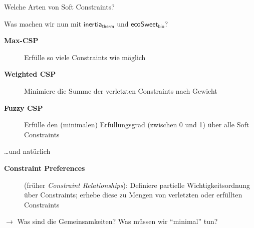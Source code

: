 \begin{frame}{Welche Arten von Soft Constraints?}

Was machen wir nun mit \alert{$\mathsf{inertia}_{\mathsf{therm}}$} und 
\alert{$\mathsf{ecoSweet}_{\mathsf{bio}}$}?
\begin{description}

\item[\textbf{Max-CSP}] Erfülle so viele Constraints wie möglich \hfill {} \pause 
\item[\textbf{Weighted CSP}] Minimiere die Summe der verletzten Constraints nach Gewicht \pause \hfill {}
\item[\textbf{Fuzzy CSP}] Erfülle den (minimalen) Erfüllungsgrad (zwischen 0 und 1) über alle Soft Constraints \hfill {} \pause 
\end{description} \pause 

\vspace*{1ex}

\ldots und natürlich 

\vspace*{1ex}

\begin{description}
\item[\textbf{Constraint Preferences}] (früher \emph{Constraint Relationships}): Definiere partielle Wichtigkeitsordnung über Constraints; erhebe diese zu Mengen von verletzten oder erfüllten Constraints \hfill {}
\end{description}

\vspace*{1ex}
\begin{parchment}
$\rightarrow$ Was sind die Gemeinsamkeiten? Was müssen wir ``minimal'' tun?
\end{parchment}
\end{frame}

